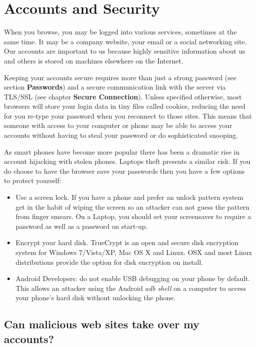 \section{Accounts and Security}

When you browse, you may be logged into various services, sometimes at
the same time. It may be a company website, your email or a social
networking site. Our accounts are important to us because highly
sensitive information about us and others is stored on machines
elsewhere on the Internet.

Keeping your accounts secure requires more than just a strong password
(see section \textbf{Passwords}) and a secure communication link with
the server via TLS/SSL (see chapter \textbf{Secure Connection}). Unless
specified otherwise, most browsers will store your login data in tiny
files called cookies, reducing the need for you re-type your password
when you reconnect to those sites. This means that someone with access
to your computer or phone may be able to access your accounts without
having to steal your password or do sophisticated snooping.

As smart phones have become more popular there has been a dramatic rise
in account hijacking with stolen phones. Laptops theft presents a
similar risk. If you do choose to have the browser save your passwords
then you have a few options to protect yourself:

\begin{itemize}
\item
  Use a screen lock. If you have a phone and prefer an unlock pattern
  system get in the habit of wiping the screen so an attacker can not
  guess the pattern from finger smears. On a Laptop, you should set your
  screensaver to require a password as well as a password on start-up.
\item
  Encrypt your hard disk. TrueCrypt is an open and secure disk
  encryption system for Windows 7/Vista/XP, Mac OS X and Linux. OSX and
  most Linux distributions provide the option for disk encryption on
  install.
\item
  Android Developers: do not enable USB debugging on your phone by
  default. This allows an attacker using the Android \emph{adb shell} on
  a computer to access your phone's hard disk without unlocking the
  phone.
\end{itemize}
\subsection{Can malicious web sites take over my accounts?}

